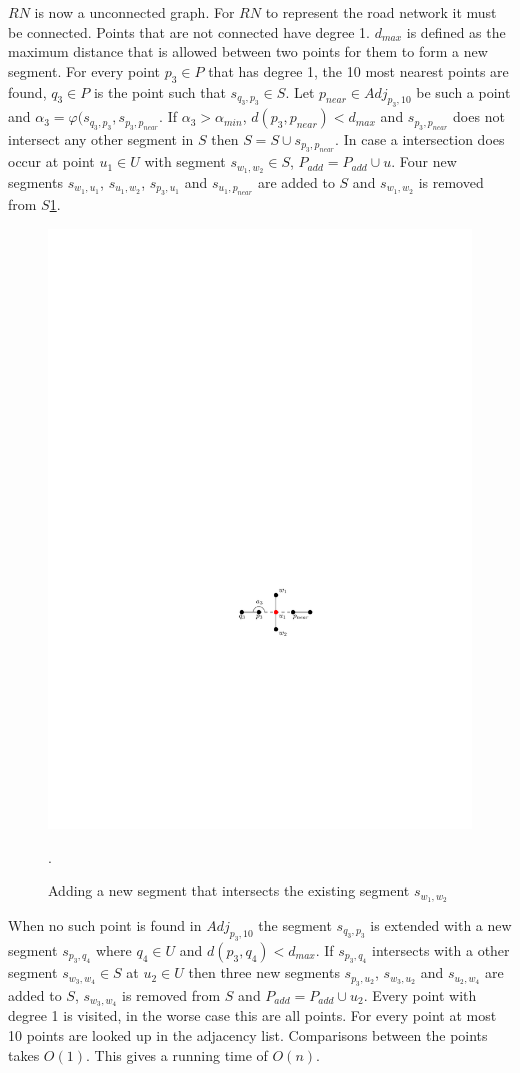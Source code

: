 \documentclass[11pt]{article}
\begin{document}
$RN$ is now a unconnected graph. For $RN$ to represent the road network it must be connected. Points that are not connected have degree 1. $d_{max}$ is defined as the maximum distance that is allowed between two points for them to form a new segment. For every point $p_3 \in P$ that has degree 1, the 10 most nearest points are found, $q_3 \in P$ is the point such that $s_{q_3, p_3} \in S$. Let $p_{near} \in Adj_{p_3,10}$ be such a point and $\alpha_3=\varphi(s_{q_3, p_3},s_{p_3, p_{near}}$. If $\alpha_3>\alpha_{min}$, $d(p_3,p_{near})<d_{max}$ and $s_{p_3, p_{near}}$ does not intersect any other segment in $S$ then $S=S \cup s_{p_3, p_{near}}$. In case a intersection does occur at point $u_1 \in U$ with segment $s_{w_1, w_2}\in S$, $P_{add}=P_{add}\cup u$. Four new segments $s_{w_1, u_1}$, $s_{u_1, w_2}$, $s_{p_3, u_1}$ and $s_{u_1, p_{near}}$ are added to $S$ and $s_{w_1, w_2}$ is removed from $S$\ref{fig:AddIntersect}.

\begin{figure}[h]
\centering
      \graphicspath{ {images/}}
      \includegraphics[width=0.5\linewidth]{NetworkAddIntersection}
      \label{fig:AddIntersect}
      \caption{Adding a new segment that intersects the existing segment $s_{w_1,w_2}$}.
  \end{figure}

When no such point is found in $Adj_{p_3,10}$ the segment $s_{q_3, p_3}$ is extended with a new segment $s_{p_3,q_4}$ where $q_4 \in U$ and $d(p_3,q_4)<d_{max}$. If $s_{p_3,q_4}$ intersects with a other segment $s_{w_3,w_4} \in S$ at $u_2 \in U$ then three new segments $s_{p_3,u_2}$, $s_{w_3,u_2}$ and $s_{u_2,w_4}$ are added to $S$, $s_{w_3,w_4}$ is removed from $S$ and $P_{add}=P_{add}\cup u_2$. Every point with degree 1 is visited, in the worse case this are all points. For every point at most 10 points are looked up in the adjacency list. Comparisons between the points takes $O(1)$. This gives a running time of $O(n)$.
\end{document}
